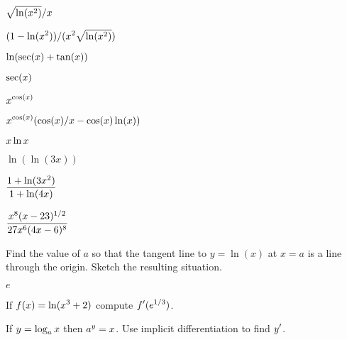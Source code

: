 \begin{exercises}
\exercise  $\displaystyle\sqrt{\ln(x^2)}/x$
\begin{answer} $\displaystyle (1-\ln(x^2))/(x^2\sqrt{\ln(x^2)})$
\end{answer}

\exercise  $\displaystyle \ln(\sec(x) + \tan(x))$
\begin{answer} $\displaystyle \sec(x)$
\end{answer}

\exercise  $\displaystyle x^{\cos(x)}$
\begin{answer} $\displaystyle x^{\cos(x)}(\cos(x)/x-\cos(x)\ln(x))$
\end{answer}

\exercise $\displaystyle x\ln x$

\exercise $\ln (\ln (3x) )$

\exercise $\displaystyle {1+\ln (3x^2 )\over 1+ \ln(4x)}$

\exercise $\displaystyle {x^8 (x-23)^{1/2}\over 27 x^6(4x-6)^8 }$

\endtwocol
\bsk
\exercise Find the value of $a$ so that the tangent line to
$y=\ln(x)$ at $x=a$ is a line through the origin.  Sketch the
 resulting situation.
\begin{answer} $e$
\end{answer}

\exercise If $\displaystyle f(x) = \ln(x^3 + 2)$ compute $\displaystyle f'(e^{1/3})$.

\exercise If $\displaystyle y=\log_a x$ then $\displaystyle a^y=x$. Use implicit
differentiation to find $\displaystyle y'$.

\end{exercises}

